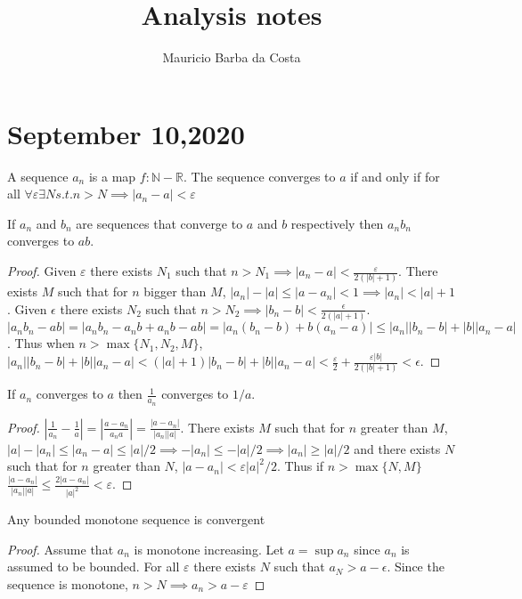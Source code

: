 \documentclass{article}
\title{Analysis notes}
\author{Mauricio Barba da Costa}
\newcommand{\N}{\mathbb{N}}
\newcommand{\R}{\mathbb{R}}
\newcommand{\eps}{\varepsilon}
\begin{document}
\maketitle
\section{September 10,2020}
\begin{definition}
A sequence $a_n$ is a map $f:\N-\R$. The sequence converges to $a$ if and only if for all $\forall\eps\exists N s.t. n>N\implies |a_n-a|<\eps$
\end{definition}
\begin{theorem}
If $a_n$ and $b_n$ are sequences that converge to $a$ and $b$ respectively then $a_nb_n$ converges to $ab$.
\end{theorem}
\begin{proof}
Given $\eps$ there exists $N_1$ such that $n>N_1\implies |a_n-a|<\frac{\eps}{2(|b|+1)}$. There exists $M$ such that for $n$ bigger than $M$, $|a_n|-|a|\leq|a-a_n|<1\implies|a_n|<|a|+1$. Given $\epsilon$ there exists $N_2$ such that $n>N_2\implies |b_n-b|<\frac{\epsilon}{2(|a|+1)}$. $|a_nb_n-ab|=|a_nb_n-a_nb+a_nb-ab|=|a_n(b_n-b)+b(a_n-a)|\leq|a_n||b_n-b|+|b||a_n-a|$.  Thus when $n>\max\{N_1,N_2,M\}$, $|a_n||b_n-b|+|b||a_n-a|<(|a|+1)|b_n-b|+|b||a_n-a|<\frac{\eps}{2}+\frac{\eps|b|}{2(|b|+1)}<\epsilon$.
\end{proof}
\begin{proposition}
If $a_n$ converges to $a$ then $\frac{1}{a_n}$ converges to $1/a$.
\end{proposition}
\begin{proof}
$|\frac{1}{a_n}-\frac{1}{a}|=|\frac{a-a_n}{a_na}|=\frac{|a-a_n|}{|a_n||a|}$. There exists $M$ such that for $n$ greater than $M$, $|a|-|a_n|\leq|a_n-a|\leq|a|/2\implies -|a_n|\leq-|a|/2\implies |a_n|\geq|a|/2$ and there exists $N$ such that for $n$ greater than $N$, $|a-a_n|<\eps|a|^2/2$. Thus if $n>\max\{N,M\}$ $\frac{|a-a_n|}{|a_n||a|}\leq\frac{2|a-a_n|}{|a|^2}<\eps$.
\end{proof}
\begin{theorem}
Any bounded monotone sequence is convergent
\end{theorem}
\begin{proof}
Assume that $a_n$ is monotone increasing. Let $a=\sup a_n$ since $a_n$ is assumed to be bounded. For all $\eps$ there exists $N$ such that $a_N>a-\epsilon$. Since the sequence is monotone, $n>N\implies a_n>a-\eps$
\end{proof}
\end{document}
